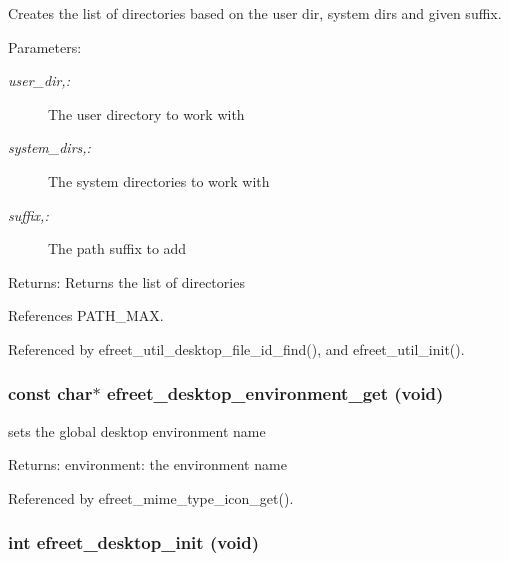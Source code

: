 Creates the list of directories based on the user dir, system dirs and given suffix. 

\begin{Desc}
\item[Parameters:]
\begin{description}
\item[{\em user\_\-dir,:}]The user directory to work with \item[{\em system\_\-dirs,:}]The system directories to work with \item[{\em suffix,:}]The path suffix to add \end{description}
\end{Desc}
\begin{Desc}
\item[Returns:]Returns the list of directories \end{Desc}


References PATH\_\-MAX.

Referenced by efreet\_\-util\_\-desktop\_\-file\_\-id\_\-find(), and efreet\_\-util\_\-init().
\subsubsection[efreet\_\-desktop\_\-environment\_\-get]{\setlength{\rightskip}{0pt plus 5cm}const char$\ast$ efreet\_\-desktop\_\-environment\_\-get (void)}\label{group__Efreet__Private_g1d9bd595ec6834a484d4e937db836c57}


sets the global desktop environment name 

\begin{Desc}
\item[Returns:]environment: the environment name \end{Desc}


Referenced by efreet\_\-mime\_\-type\_\-icon\_\-get().
\subsubsection[efreet\_\-desktop\_\-init]{\setlength{\rightskip}{0pt plus 5cm}int efreet\_\-desktop\_\-init (void)}\label{group__Efreet__Private_g1cc25fc125fb1efc462b17b85088bd46}





